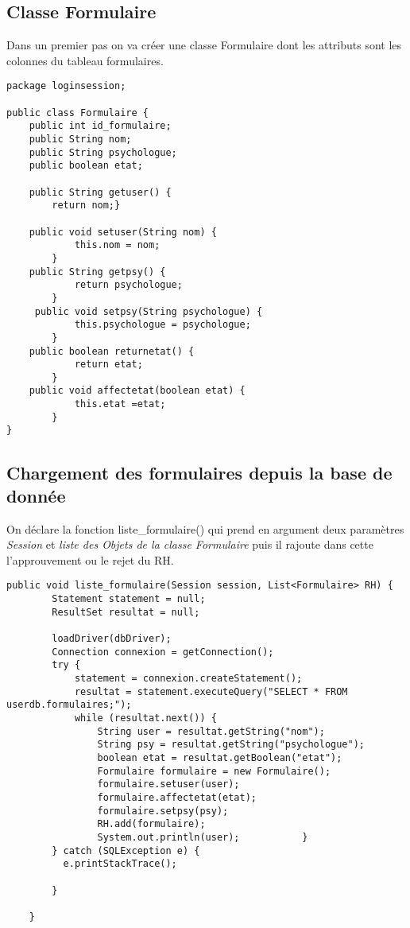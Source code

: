 \documentclass[12]{article}
\begin{document}
\subsection{Classe Formulaire}

Dans un premier pas on va créer une classe Formulaire dont les attributs sont les colonnes du tableau formulaires.
\begin{scriptsize}

\lstset{language=java}
\begin{lstlisting}
package loginsession;

public class Formulaire {
	public int id_formulaire;
	public String nom;
	public String psychologue;
	public boolean etat;
	
	public String getuser() {
		return nom;}
		
	public void setuser(String nom) {
	        this.nom = nom;
	    }
	public String getpsy() {
	        return psychologue;
	    }
	 public void setpsy(String psychologue) {
	        this.psychologue = psychologue;
	    }
    public boolean returnetat() {
			return etat;
		}
    public void affectetat(boolean etat) {
			this.etat =etat;
		}
}
\end{lstlisting}
\end{scriptsize}
\subsection{Chargement des formulaires depuis la base de donnée}

On déclare la fonction liste\_formulaire() qui prend en argument deux paramètres \textit{Session} et \textit{liste des Objets de la classe Formulaire} puis il rajoute dans cette l'approuvement ou le rejet du RH.

\begin{scriptsize}
\lstset{language=java}
\begin{lstlisting}
public void liste_formulaire(Session session, List<Formulaire> RH) {
        Statement statement = null;
        ResultSet resultat = null;

        loadDriver(dbDriver);
        Connection connexion = getConnection();
        try {
            statement = connexion.createStatement();
            resultat = statement.executeQuery("SELECT * FROM userdb.formulaires;");
            while (resultat.next()) {
                String user = resultat.getString("nom");
                String psy = resultat.getString("psychologue");
                boolean etat = resultat.getBoolean("etat");
                Formulaire formulaire = new Formulaire();
                formulaire.setuser(user);
                formulaire.affectetat(etat);
                formulaire.setpsy(psy);
                RH.add(formulaire);
                System.out.println(user);           }
        } catch (SQLException e) {
          e.printStackTrace();
            
        }
       
    }
\end{lstlisting}
\end{scriptsize}
\end{document}
